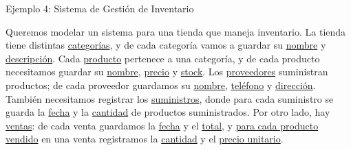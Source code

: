 \documentclass{beamer}
\begin{document}
\begin{frame}{Ejemplo 4: Sistema de Gestión de Inventario}
    \begin{center}
        \small
        Queremos modelar un sistema para una tienda que maneja inventario. La tienda tiene distintas \ul{categorías}, y de cada categoría vamos a guardar su \ul{nombre} y \ul{descripción}. Cada \ul{producto} pertenece a una categoría, y de cada producto necesitamos guardar su \ul{nombre}, \ul{precio} y \ul{stock}. Los \ul{proveedores} suministran productos; de cada proveedor guardamos su \ul{nombre}, \ul{teléfono} y \ul{dirección}. También necesitamos registrar los \ul{suministros}, donde para cada suministro se guarda la \ul{fecha} y la \ul{cantidad} de productos suministrados. Por otro lado, hay \ul{ventas}: de cada venta guardamos la \ul{fecha} y el \ul{total}, y \ul{para cada producto vendido} en una venta registramos la \ul{cantidad} y el \ul{precio unitario}.
    \end{center}
\end{frame}
\end{document}
